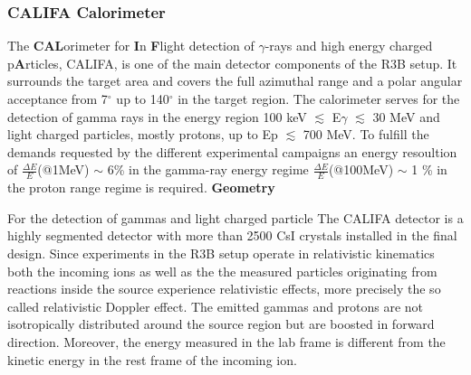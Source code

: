 \subsubsection{CALIFA Calorimeter}
The \textbf{CAL}orimeter for \textbf{I}n \textbf{F}light detection of $\gamma$-rays and high energy charged p\textbf{A}rticles, CALIFA, is one of the main detector components of the R3B setup. It surrounds the target area and covers the full azimuthal range and a polar angular acceptance from 7$^{\circ}$ up to 140$^{\circ}$ in the target region. The calorimeter serves for the detection of gamma rays in the energy region 100 keV $\lesssim$ E\textunderscore$\gamma$ $\lesssim$ 30 MeV and light charged particles, mostly protons, up to E\textunderscore p $\lesssim$ 700 MeV. To fulfill the demands requested by the different experimental campaigns an energy resoultion of $\frac{\Delta E}{E}$(@1MeV) $\sim$ 6\% in the gamma-ray energy regime $\frac{\Delta E}{E}$(@100MeV) $\sim$ 1 \% in the proton range regime is required.\newline
%
\textbf{Geometry}\newline

For the detection of gammas and light charged particle 
The CALIFA detector is a highly segmented detector with more than 2500 CsI crystals installed in the final design. Since experiments in the R3B setup operate in relativistic kinematics both the incoming ions as well as the the measured particles originating from reactions inside the source experience relativistic effects, more precisely the so called relativistic Doppler effect. The emitted gammas and protons are not isotropically distributed around the source region but are boosted in forward direction. Moreover, the energy measured in the lab frame is different from the kinetic energy in the rest frame of the incoming ion.\newline


